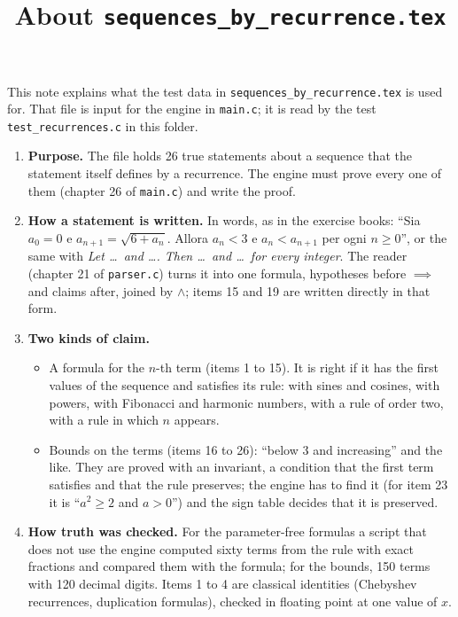 \documentclass[11pt,a4paper]{article}
\title{About \texttt{sequences\_by\_recurrence.tex}}
\author{}
\date{}
\begin{document}
\maketitle
This note explains what the test data in \texttt{sequences\_by\_recurrence.tex} is used for. That file is input for the engine in \texttt{main.c}; it is read by the test \texttt{test\_recurrences.c} in this folder.

\begin{enumerate}
\item \textbf{Purpose.} The file holds 26 true statements about a sequence that the statement itself defines by a recurrence. The engine must prove every one of them (chapter 26 of \texttt{main.c}) and write the proof.

\item \textbf{How a statement is written.} In words, as in the exercise books: ``Sia $a_0 = 0$ e $a_{n+1} = \sqrt{6 + a_n}$. Allora $a_n < 3$ e $a_n < a_{n+1}$ per ogni $n \ge 0$'', or the same with \emph{Let \ldots\ and \ldots. Then \ldots\ and \ldots\ for every integer}. The reader (chapter 21 of \texttt{parser.c}) turns it into one formula, hypotheses before $\implies$ and claims after, joined by $\land$; items 15 and 19 are written directly in that form.

\item \textbf{Two kinds of claim.}
\begin{itemize}
\item A formula for the $n$-th term (items 1 to 15). It is right if it has the first values of the sequence and satisfies its rule: with sines and cosines, with powers, with Fibonacci and harmonic numbers, with a rule of order two, with a rule in which $n$ appears.
\item Bounds on the terms (items 16 to 26): ``below $3$ and increasing'' and the like. They are proved with an invariant, a condition that the first term satisfies and that the rule preserves; the engine has to find it (for item 23 it is ``$a^2 \ge 2$ and $a > 0$'') and the sign table decides that it is preserved.
\end{itemize}

\item \textbf{How truth was checked.} For the parameter-free formulas a script that does not use the engine computed sixty terms from the rule with exact fractions and compared them with the formula; for the bounds, 150 terms with 120 decimal digits. Items 1 to 4 are classical identities (Chebyshev recurrences, duplication formulas), checked in floating point at one value of $x$.


\end{enumerate}
\end{document}

